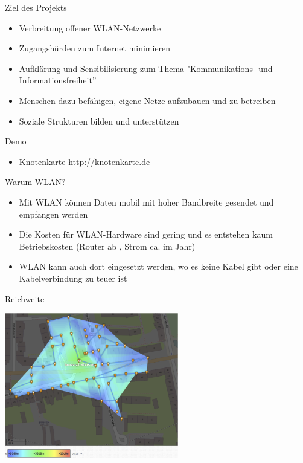 \documentclass[c]{beamer}
\begin{document}
\begin{frame}{Ziel des Projekts}
	\begin{itemize}
		\item Verbreitung offener WLAN-Netzwerke
		\item Zugangshürden zum Internet minimieren
		\item Aufklärung und Sensibilisierung zum Thema "Kommunikations- und Informationsfreiheit''
		\item Menschen dazu befähigen, eigene Netze aufzubauen und zu betreiben
		\item Soziale Strukturen bilden und unterstützen
	\end{itemize}
\end{frame}


\begin{frame}{Demo}
	\begin{itemize}
		\item Knotenkarte \href{http://knotenkarte.de}{http://knotenkarte.de}
	\end{itemize}
\end{frame}



\begin{frame}{Warum WLAN?}
	\begin{itemize}
		\item Mit WLAN können Daten mobil mit hoher Bandbreite gesendet und empfangen werden
		\item Die Kosten für WLAN-Hardware sind gering und es entstehen kaum Betriebskosten (Router ab , Strom ca.  im Jahr)
		\item WLAN kann auch dort eingesetzt werden, wo es keine Kabel gibt oder eine Kabelverbindung zu teuer ist
	\end{itemize}
\end{frame}


\begin{frame}{Reichweite}
	\begin{center}
		\includegraphics[height=180pt]{Bilder/Reichweite_altona001}
	\end{center}
\end{frame}
\end{document}
